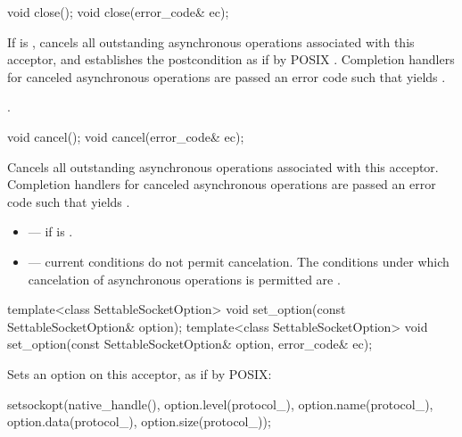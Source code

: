 \begin{itemdecl}
void close();
void close(error_code& ec);
\end{itemdecl}

\begin{itemdescr}
\pnum
\effects If  is , cancels all outstanding asynchronous operations associated with this acceptor, and establishes the postcondition as if by POSIX . Completion handlers for canceled asynchronous operations are passed an error code  such that  yields .

\pnum
\postconditions {}.
\end{itemdescr}

\begin{itemdecl}
void cancel();
void cancel(error_code& ec);
\end{itemdecl}

\begin{itemdescr}
\pnum
\effects Cancels all outstanding asynchronous operations associated with this acceptor. Completion handlers for canceled asynchronous operations are passed an error code  such that  yields .

\pnum
\errors
\begin{itemize}
\item
{} --- if  is .
\item
{} --- current conditions do not permit cancelation. The conditions under which cancelation of asynchronous operations is permitted are .
\end{itemize}
\end{itemdescr}

\begin{itemdecl}
template<class SettableSocketOption>
  void set_option(const SettableSocketOption& option);
template<class SettableSocketOption>
  void set_option(const SettableSocketOption& option, error_code& ec);
\end{itemdecl}

\begin{itemdescr}
\pnum
\effects Sets an option on this acceptor, as if by POSIX:
\begin{codeblock}
setsockopt(native_handle(), option.level(protocol_), option.name(protocol_),
           option.data(protocol_), option.size(protocol_));
\end{codeblock}
\end{itemdescr}

